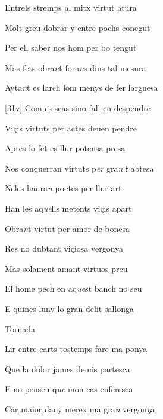 \documentclass[12pt]{article}
\begin{document}
\begin{estrofa}

 Entrels stremps al mitx virtut atura

 Molt greu dobrar y entre pochs conegut

 Per ell saber nos hom per bo tengut

 Mas fets obra\textit{n}t fora\textit{n}s dins tal mesura

 Ayta\textit{n}t es larch lom menys de fer larguesa

 [31v] Com es scas sino fall en despendre

 Vi\c{c}is virtuts per actes deuen pendre

 Apres lo fet es llur potensa presa

\end{estrofa}



\begin{estrofa}

 Nos conquerran virtuts p\textit{er} gra\textit{n }\sout{l}\textit{ }abtesa

 Neles haura\textit{n} poetes per llur art

 Han les aq\textit{ue}lls metents vi\c{c}is apart

 Obra\textit{n}t virtut per amor de bonesa

 Res no dubtant vi\c{c}iosa vergonya

 Mas solament amant virtuos preu

 El home pech en aq\textit{ue}st banch no seu

 E quines luny lo gran delit sallonga

\end{estrofa}


\begin{estrofaExtra}%




\begin{tornada}

Tornada

\end{tornada}


\end{estrofaExtra}


\begin{estrofa}

 Lir entre carts tostemps fare ma ponya

 Que la dolor james demis partesca

 E no penseu q\textit{ue }mon cas enferesca

 Car maior dany merex ma gra\textit{n} vergon\textit{y}a

\end{estrofa}
\end{document}
